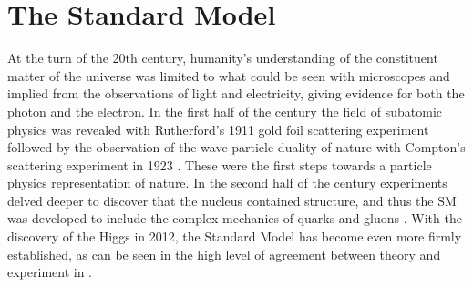 \section{The Standard Model} \label{sec:theory:standardmodel}

At the turn of the 20th century, humanity's understanding of the constituent
matter of the universe was limited to what could be seen with microscopes and
implied from the observations of light and electricity, giving evidence for
both the photon and the electron.  In the first half of the century the field
of subatomic physics was revealed with Rutherford's 1911 gold foil scattering
experiment \cite{Rutherford:1911zz} followed by the observation of the
wave-particle duality of nature with Compton's scattering experiment in 1923
\cite{PhysRev.21.483}. These were the first steps towards a particle physics
representation of nature.  In the second half of the century experiments delved
deeper to discover that the nucleus contained structure, and thus the SM was
developed to include the complex mechanics of quarks and gluons
\cite{Fritzsch:1972jv}.  With the discovery of the Higgs in 2012, the Standard
Model has become even more firmly established, as can be seen in the high level
of agreement between theory and experiment in .

